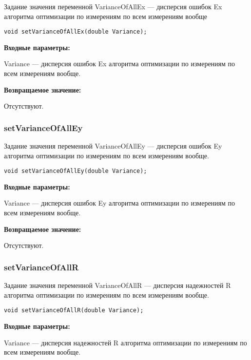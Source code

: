 \documentclass[a4paper,12pt]{article}
\begin{document}
Задание значения переменной VarianceOfAllEx --- дисперсия ошибок Ex алгоритма оптимизации по измерениям по всем измерениям вообще


\begin{lstlisting}[label=code_syntax_setVarianceOfAllEx,caption=Синтаксис]
void setVarianceOfAllEx(double Variance);
\end{lstlisting}

\textbf{Входные параметры:}

Variance --- дисперсия ошибок Ex алгоритма оптимизации по измерениям по всем измерениям вообще.

\textbf{Возвращаемое значение:}

Отсутствуют.


\subsubsection{setVarianceOfAllEy}\label{setVarianceOfAllEy}

Задание значения переменной VarianceOfAllEy --- дисперсия ошибок Ey алгоритма оптимизации по измерениям по всем измерениям вообще.


\begin{lstlisting}[label=code_syntax_setVarianceOfAllEy,caption=Синтаксис]
void setVarianceOfAllEy(double Variance);
\end{lstlisting}

\textbf{Входные параметры:}

Variance --- дисперсия ошибок Ey алгоритма оптимизации по измерениям по всем измерениям вообще.

\textbf{Возвращаемое значение:}

Отсутствуют.


\subsubsection{setVarianceOfAllR}\label{setVarianceOfAllR}

Задание значения переменной VarianceOfAllR --- дисперсия надежностей R алгоритма оптимизации по измерениям по всем измерениям вообще.


\begin{lstlisting}[label=code_syntax_setVarianceOfAllR,caption=Синтаксис]
void setVarianceOfAllR(double Variance);
\end{lstlisting}

\textbf{Входные параметры:}

Variance --- дисперсия надежностей R алгоритма оптимизации по измерениям по всем измерениям вообще.
\end{document}
